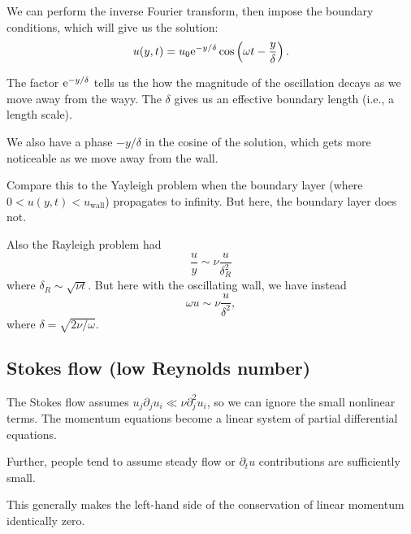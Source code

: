 \begin{node}
We can perform the inverse Fourier transform, then impose the boundary
conditions, which will give us the solution:
\begin{equation}
u(y,t)=u_{0}\mathrm{e}^{-y/\delta}\cos\left(\omega t-\frac{y}{\delta}\right).
\end{equation}
\end{node}

\begin{remark}
The factor $\mathrm{e}^{-y/\delta}$ tells us the how the magnitude of the
oscillation decays as we move away from the wayy. The $\delta$ gives
us an effective boundary length (i.e., a length scale).
\end{remark}

\begin{remark}
We also have a phase $-y/\delta$ in the cosine of the solution, which
gets more noticeable as we move away from the wall.
\end{remark}

\begin{remark}
Compare this to the Yayleigh problem when the boundary layer
(where $0<u(y,t)<u_{\text{wall}}$) propagates to infinity. But here,
the boundary layer does not.

Also the Rayleigh problem had
\begin{equation}
\frac{u}{y}\sim\nu\frac{u}{\delta_{R}^{2}}
\end{equation}
where $\delta_{R}\sim\sqrt{\nu t}$. But here with the oscillating
wall, we have instead
\begin{equation}
\omega u\sim\nu\frac{u}{\delta^{2}},
\end{equation}
where $\delta=\sqrt{2\nu/\omega}$.
\end{remark}

\subsection{Stokes flow (low Reynolds number)}

\begin{problem}
The Stokes flow assumes $u_{j}\partial_{j}u_{i}\ll\nu\partial_{j}^{2}u_{i}$,
so we can ignore the small nonlinear terms. The momentum equations
become a linear system of partial differential equations.
\end{problem}

\begin{node}
Further, people tend to assume steady flow or $\partial_{t}u$
contributions are sufficiently small.

This generally makes the left-hand side of the conservation of linear
momentum identically zero.
\end{node}
